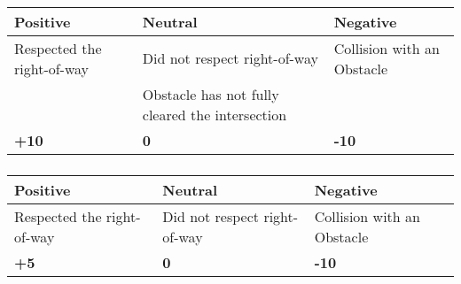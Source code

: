 {	\subsubsection*{}
	\begin{table}[H]
		\begin{tabularx}{\textwidth}{XXX}
			\toprule
			\textbf{Positive}          & \textbf{Neutral}                                & \textbf{Negative}          \\
			\midrule
			Respected the right-of-way & Did not respect right-of-way                    & Collision with an Obstacle \\
			                           & Obstacle has not fully cleared the intersection &                            \\
			\topstrut
			\textbf{+10}               & \textbf{0}                                      & \textbf{-10}               \\
			\bottomrule
		\end{tabularx}
	\end{table}

	\subsubsection*{}
	\begin{table}[H]
		\begin{tabularx}{\textwidth}{XXX}
			\toprule
			\textbf{Positive}                           & \textbf{Neutral}             & \textbf{Negative}          \\
			\midrule
			Respected the right-of-way \footnotemark[1] & Did not respect right-of-way & Collision with an Obstacle \\
			\topstrut
			\textbf{+5}                                 & \textbf{0}                   & \textbf{-10}               \\
			\bottomrule
		\end{tabularx}
	\end{table}

	\newpage


}
